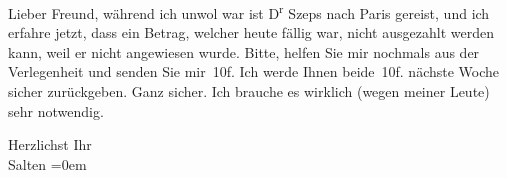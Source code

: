 \pstart{}Lieber Freund,\pend\vspace{0.5em}
\pstart
           während ich unwol war ist D\textsuperscript{r}{ }Szeps nach Paris gereist,
               und ich erfahre jetzt, dass ein Betrag, welcher heute
               fällig war, nicht ausgezahlt werden kann, weil er nicht angewiesen wurde. Bitte,
               helfen Sie mir nochmals aus der Verlegenheit und senden Sie mir 10f. Ich werde Ihnen
               beide 10f. nächste Woche sicher zurückgeben. Ganz sicher. Ich brauche es wirklich
               (wegen meiner Leute) sehr notwendig.\pend
           
\pstart
           Herzlichst Ihr {\\[\baselineskip]}\spacefill\mbox{Salten}\pend
           \leftskip=0em{}\endnumbering{}  \newcommand{\dateiname}{L03285}\newcommand{\titel}{Felix Salten an Arthur Schnitzler, 10. 12. 1898}\newcommand{\editorInnen}{Martin Anton Müller und Laura Untner}

